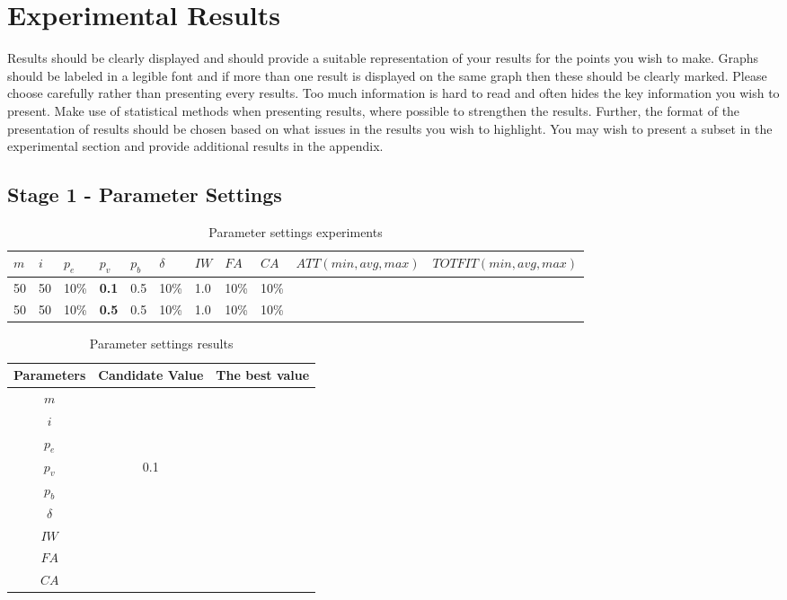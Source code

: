 \section{Experimental Results}

Results should be clearly displayed and should provide a suitable representation of your results for the points you wish to make. Graphs should be labeled in a legible font and if more than one result is displayed on the same graph then these should be clearly marked.   Please choose carefully rather than presenting every results. Too much information is hard to read and often hides the key information you wish to present. Make use of statistical methods when presenting results, where possible to strengthen the results.  Further, the format of the presentation of results should be chosen based on what issues in the results you wish to highlight. You may wish to present a subset in the experimental section and provide additional results in the appendix.

\subsection{Stage 1 - Parameter Settings}
\label{subsec:parameterSettings_results}

	\begin{table}[H]
	\centering
	\tiny
    \begin{tabular}{|l|l|l|l|l|l|l|l|l||l|l|}
 	\hline
 	$m$ & $i$ & $p_{e}$ & $p_{v}$ & $p_{b}$ & $\delta$ & $IW$ & $FA$ & $CA$ &  $ATT(min,avg,max)$ &  $TOTFIT(min,avg,max)$ \\
 	\hline
    50 & 50 & 10\% & \textbf{0.1} & 0.5 & 10\% & 1.0 & 10\% & 10\% & ~ & ~  \\
    50 & 50 & 10\% & \textbf{0.5} & 0.5 & 10\% & 1.0 & 10\% & 10\% & ~ & ~  \\
	\hline
    \end{tabular}
    \caption {Parameter settings experiments}
    \label{table:parameterSettings}
	\end{table}


	\begin{table}[H]
	\centering
    \begin{tabular}{|c|c||c|}
 	\hline
 	Parameters & Candidate Value & The best value\\
 	\hline
    $m$ & ~ & ~ \\
    $i$ & ~ & ~ \\
    $p_{e}$ & ~ & ~ \\
    $p_{v}$ & 0.1 & ~ \\
    $p_{b}$ & ~ & ~ \\
    $\delta$ & ~ & ~ \\
    $IW$ & ~ & ~ \\
    $FA$ & ~ & ~ \\
    $CA$ & ~ & ~ \\
	\hline
    \end{tabular}
    \caption {Parameter settings results}
    \label{table:parameterSettings2}
	\end{table}

